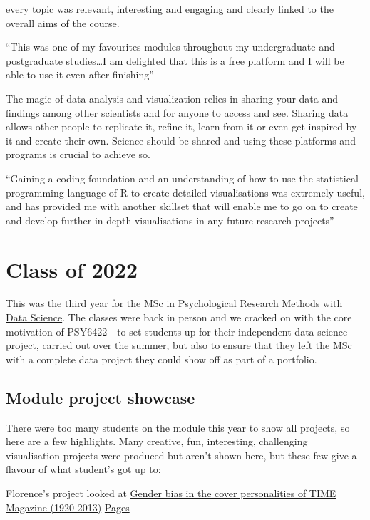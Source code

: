 \documentclass[
]{book}
\begin{document}
every topic was relevant, interesting and engaging and clearly linked to the overall aims of the course.

``This was one of my favourites modules throughout my undergraduate and postgraduate studies\ldots I am delighted that this is a free platform and I will be able to use it even after finishing''

The magic of data analysis and visualization relies in sharing your data and findings among other scientists and for anyone to access and see. Sharing data allows other people to replicate it, refine it, learn from it or even get inspired by it and create their own. Science should be shared and using these platforms and programs is crucial to achieve so.

``Gaining a coding foundation and an understanding of how to use the statistical programming language of R to create detailed visualisations was extremely useful, and has provided me with another skillset that will enable me to go on to create and develop further in-depth visualisations in any future research projects''

\hypertarget{class-of-2022}{%
\chapter{Class of 2022}\label{class-of-2022}}

This was the third year for the \href{https://www.sheffield.ac.uk/postgraduate/taught/courses/2022/psychological-research-methods-data-science-msc}{MSc in Psychological Research Methods with Data Science}. The classes were back in person and we cracked on with the core motivation of PSY6422 - to set students up for their independent data science project, carried out over the summer, but also to ensure that they left the MSc with a complete data project they could show off as part of a portfolio.

\hypertarget{module-project-showcase}{%
\section{Module project showcase}\label{module-project-showcase}}

There were too many students on the module this year to show all projects, so here are a few highlights. Many creative, fun, interesting, challenging visualisation projects were produced but aren't shown here, but these few give a flavour of what student's got up to:

Florence's project looked at \href{https://fsgwilliams.github.io/Data-Visualisation/}{Gender bias in the cover personalities of TIME Magazine (1920-2013)}
\href{https://github.com/fsgwilliams/Data-Visualisation}{Pages}
\end{document}
